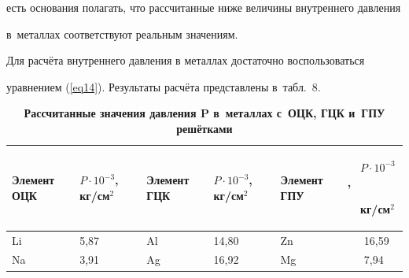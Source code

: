 есть основания полагать, что рассчитанные ниже величины внутреннего давления 

в~металлах соответствуют реальным значениям.



Для расчёта внутреннего давления в металлах достаточно воспользоваться 

уравнением (\ref{eq14}). Результаты расчёта представлены в~табл.~8.



\begin{table}[b!]

\centering

\begin{minipage}{.87\textwidth}

\centering

\caption{\bf Рассчитанные значения давления $\boldsymbol P$ в~металлах с~ОЦК, ГЦК и~ГПУ решётками}

\vspace{-3mm}

\begin{tabular}{p{1.5cm}|p{1.5cm}|p{1.5cm}|p{1.5cm}|p{1.5cm}|p{1.5cm}}

\hline \centering

Элемент ОЦК& \centering

$P\cdot 10^{-3}$, кг/см$^{2}$& \centering

Элемент ГЦК& \centering

$P\cdot 10^{-3}$, кг/см$^{2}$& \centering

Элемент ГПУ& 

~~$P\cdot 10^{-3}$, \par ~~кг/см$^{2}$ \\

\hline \centering

Li& \centering

5,87& \centering

Al& \centering

14,80& \centering

Zn& 

~~~16,59 \\


\centering

Na& \centering

3,91& \centering

Ag& \centering

16,92& \centering

Mg& 

~~~7,94 \\


\end{tabular}
\end{minipage}
\end{table}
